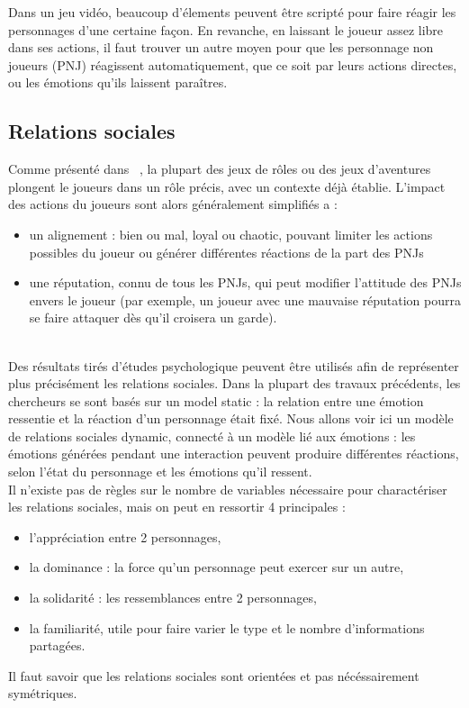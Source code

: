 \documentclass[asi]{picINSA}
\begin{document}
Dans un jeu vidéo, beaucoup d'élements peuvent être scripté pour faire réagir les personnages d'une certaine façon. En revanche, en laissant le joueur assez libre dans ses actions, il faut trouver un autre moyen pour que les personnage non joueurs (PNJ) réagissent automatiquement, que ce soit par leurs actions directes, ou les émotions qu'ils laissent paraîtres.\\

\subsection{Relations sociales}

Comme présenté dans ~\cite{IRIS:conf/aiide/OchsSC2008}, la plupart des jeux de rôles ou des jeux d'aventures plongent le joueurs dans un rôle précis, avec un contexte déjà établie. L'impact des actions du joueurs sont alors généralement simplifiés a :

\begin{itemize}
\item un alignement : bien ou mal, loyal ou chaotic, pouvant limiter
  les actions possibles du joueur ou générer différentes réactions de
  la part des PNJs

\item une réputation, connu de tous les PNJs, qui peut modifier
  l'attitude des PNJs envers le joueur (par exemple, un joueur avec
  une mauvaise réputation pourra se faire attaquer dès qu'il croisera
  un garde).
\end{itemize}

~\\
Des résultats tirés d'études psychologique peuvent être utilisés afin de représenter plus précisément les relations sociales. Dans la plupart des travaux précédents, les chercheurs se sont basés sur un model static : la relation entre une émotion ressentie et la réaction d'un personnage était fixé. Nous allons voir ici un modèle de relations sociales dynamic, connecté à un modèle lié aux émotions : les émotions générées pendant une interaction peuvent produire différentes réactions, selon l'état du personnage et les émotions qu'il ressent.\\

Il n'existe pas de règles sur le nombre de variables nécessaire pour charactériser les relations sociales, mais on peut en ressortir 4 principales : 
\begin{itemize}
\item l'appréciation entre 2 personnages,
\item la dominance : la force qu'un personnage peut exercer sur un autre,
\item la solidarité : les ressemblances entre 2 personnages,
\item la familiarité, utile pour faire varier le type et le nombre d'informations partagées.
\end{itemize}
Il faut savoir que les relations sociales sont orientées et pas nécéssairement symétriques.\\
\end{document}
